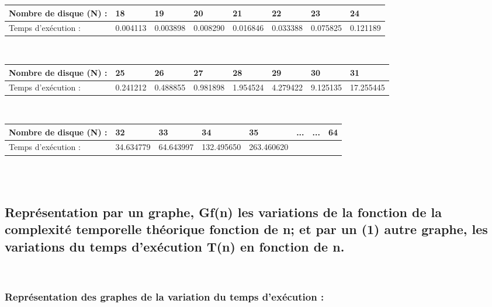 \documentclass[12pt]{article}
\begin{document}
\begin{tabular}{|p{3cm}||p{1.7cm}|p{1.7cm}|p{1.7cm}|p{1.7cm}|p{1.7cm}|p{1.7cm}|p{1.7cm}|}
\hline
Nombre de disque (N) : & 18 & 19 & 20 & 21 & 22 & 23 & 24  \\
\hline
Temps d'exécution :  & 0.004113 & 0.003898 & 0.008290 & 0.016846 & 0.033388 & 0.075825 & 0.121189  \\
\hline

\end{tabular}
\\

\begin{tabular}{|p{3cm}||p{1.7cm}|p{1.7cm}|p{1.7cm}|p{1.7cm}|p{1.7cm}|p{1.7cm}|p{1.7cm}|}
\hline
Nombre de disque (N) : & 25 & 26 & 27 & 28 & 29 & 30 & 31  \\
\hline
Temps d'exécution : & 0.241212 & 0.488855 & 0.981898 & 1.954524 & 4.279422 & 9.125135 & 17.255445  \\
\hline

\end{tabular}
\\

\begin{tabular}{|p{3cm}||p{1.7cm}|p{1.7cm}|p{1.7cm}|p{1.7cm}|p{1.7cm}|p{1.7cm}|p{1.7cm}|}
\hline
Nombre de disque (N) : & 32 & 33 & 34 & 35 & ... & ... & 64 \\
\hline
Temps d'exécution : & 34.634779 & 64.643997 & 132.495650 & 263.460620 &  &  & \\
\hline

\end{tabular}
\\

 


\textrm{  }
\\
\color{black}





\subsection{Représentation par un graphe, Gf(n) les variations de la fonction de la complexité temporelle théorique  fonction de n; et par un (1) autre graphe,  les variations  du temps d'exécution T(n) en fonction de n.}
\texttt{  }\\

\subsubsection{Représentation des graphes de la variation du temps d'exécution :}
\end{document}
